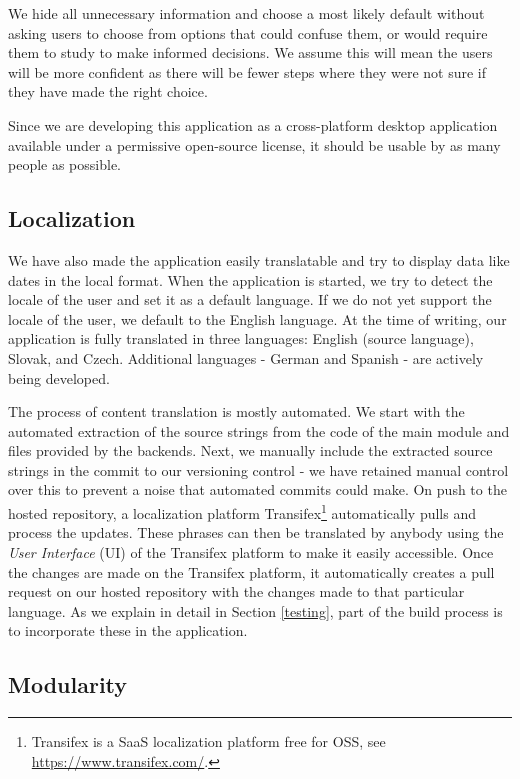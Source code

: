 \documentclass[thesismargins, english, thesislinespacing, onelinechapterstyle, upjsfrontpage]{rnthesis}
\begin{document}
We hide all unnecessary information and choose a most likely default without asking users to choose from options that could confuse them, or would require them to study to make informed decisions.
We assume this will mean the users will be more confident as there will be fewer steps where they were not sure if they have made the right choice.

Since we are developing this application as a cross-platform desktop application available under a permissive open-source license, it should be usable by as many people as possible.

\subsection{Localization}

We have also made the application easily translatable and try to display data like dates in the local format.
When the application is started, we try to detect the locale of the user and set it as a default language.
If we do not yet support the locale of the user, we default to the English language.
At the time of writing, our application is fully translated in three languages: English (source language), Slovak, and Czech.
Additional languages - German and Spanish - are actively being developed.

The process of content translation is mostly automated.
We start with the automated extraction of the source strings from the code of the main module and files provided by the backends.
Next, we manually include the extracted source strings in the commit to our versioning control - we have retained manual control over this to prevent a noise that automated commits could make.
On push to the hosted repository, a localization platform Transifex\footnote{Transifex is a SaaS localization platform free for OSS, see \url{https://www.transifex.com/}.} automatically pulls and process the updates.
These phrases can then be translated by anybody using the \textit{User Interface} (UI) of the Transifex platform to make it easily accessible.
Once the changes are made on the Transifex platform, it automatically creates a pull request on our hosted repository with the changes made to that particular language.
As we explain in detail in Section \ref{testing}, part of the build process is to incorporate these in the application.

\subsection{Modularity}
\end{document}
